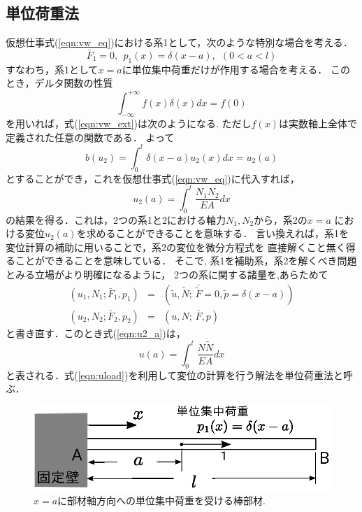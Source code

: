 \documentclass[10pt,a4j]{jarticle}
\begin{document}
\subsection{単位荷重法}
仮想仕事式(\ref{eqn:vw_eq})における系1として，次のような特別な場合を考える．
\begin{equation}
	\bar F_1=0, \ \ p_1(x)=\delta(x-a), \ \ (0<a<l)
	\label{eqn:sys1}
\end{equation}
すなわち，系1として$x=a$に単位集中荷重だけが作用する場合を考える．
このとき，デルタ関数の性質
\begin{equation}
	\int_{-\infty}^{+\infty} f(x) \delta(x)dx =f(0)
	\label{eqn:dlt_sampling}
\end{equation}
を用いれば，式(\ref{eqn:vw_ext})は次のようになる. 
ただし$f(x)$は実数軸上全体で定義された任意の関数である．
よって
\begin{equation}
	b(u_2)=\int_0^l \delta(x-a)u_2(x)dx= u_2(a)
	\label{eqn:vw_eq_dlt}
\end{equation}
とすることができ，これを仮想仕事式(\ref{eqn:vw_eq})に代入すれば，
\begin{equation}
	u_2(a)=\int_0^l \frac{N_1N_2}{EA}dx
	\label{eqn:u2_a}
\end{equation}
の結果を得る．これは，2つの系1と2における軸力$N_1, N_2$から，系2の$x=a$
における変位$u_2(a)$を求めることができることを意味する．
言い換えれば，系1を変位計算の補助に用いることで，系2の変位を微分方程式を
直接解くこと無く得ることができることを意味している．
そこで, 系1を補助系，系2を解くべき問題とみる立場がより明確になるように，
2つの系に関する諸量を,あらためて 
\begin{eqnarray}
	\left( u_1, N_1; \bar F_1, p_1 \right)& = &
		\left(\tilde u, \tilde N;\, \bar{\tilde{F}}=0, \tilde p= \delta(x-a) \right) 
	\label{eqn:aux}
	\\
	\left( u_2, N_2; \bar F_2, p_2 \right)& = &
		\left( u,  N;\, \bar F, p \right) 
	\label{eqn:prb}
\end{eqnarray}
と書き直す．このとき式(\ref{eqn:u2_a})は，
\begin{equation}
	u(a)=\int_0^l \frac{N \tilde N}{EA}dx
	\label{eqn:uload}
\end{equation}
と表される．式(\ref{eqn:uload})を利用して変位の計算を行う解法を単位荷重法と呼ぶ．
\begin{figure}[h]
	\begin{center}
	\includegraphics[width=0.4\linewidth]{fig1_3.eps} 
	\end{center}
	\caption{$x=a$に部材軸方向への単位集中荷重を受ける棒部材.} 
	\label{fig:fig1_3}
\end{figure}
%
\end{document}
